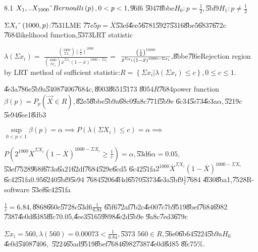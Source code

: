 \documentclass{article}
\begin{document}
8.1 $X_{1},..X_{1000}\symbol{126}Bernoulli\left( p\right) ,0<p<1,$\U{96f6}%
\U{5047}\U{8bbe}$H_{0}:p=\frac{1}{2},$\U{5bf9}$H_{1}:p\neq \frac{1}{2}$

$\Sigma X_{i}\symbol{126}\left( 1000,p\right) $:\U{7531}LME \U{77e5}$p=%
\overline{X}$\U{53ef}\U{4ee5}\U{6781}\U{5927}\U{5316}\U{8be5}\U{6837}\U{672c}%
\U{7684}likelihood function,\U{5373}LRT statistic

$\lambda \left( \Sigma x_{i}\right) =$ $\frac{\binom{1000}{\Sigma x_{i}}%
\left( \frac{1}{2}\right) ^{1000}}{\binom{1000}{\Sigma x_{i}}\bar{x}^{\Sigma
x_{i}}\left( 1-\bar{x}\right) ^{1000-\Sigma x_{i}}}=$ $\frac{\left( \frac{1}{%
2}\right) ^{1000}}{\bar{x}^{\Sigma x_{i}}\left( 1-\bar{x}\right)
^{1000-\Sigma x_{i}}},$\U{8bbe}\U{7f6e}Rejection region by LRT method of
sufficient statistic:$R=\left\{ \Sigma x_{i}|\lambda \left( \Sigma
x_{i}\right) \leq c\right\} ,0\leq c\leq 1.$

\U{4e3a}\U{786e}\U{5b9a}\U{5408}\U{7406}\U{7684}$c,$\U{8003}\U{8651}\U{5173}%
\U{8054}$R$\U{7684}power function $\beta \left( p\right) =P_{p}\left( \vec{X}%
\in R\right) ,$\U{82e5}\U{8bbe}\U{5b9a}\U{68c0}\U{9a8c}\U{771f}\U{5b9e}%
\U{6c34}\U{5e73}\U{4e3a}$\alpha ,$\U{5219}$c$\U{5e94}\U{6ee1}\U{8db3}

$\underset{0<p<1}{\sup }\beta \left( p\right) =\alpha \implies P\left(
\lambda \left( \Sigma X_{i}\right) \leq c\right) =\alpha \implies $

$P\left( 2^{1000}\overline{X}^{\Sigma X_{i}}\left( 1-\overline{X}\right)
^{1000-\Sigma X_{i}}\geq \frac{1}{c}\right) =\alpha ,$\U{53d6}$\alpha =0.05,$%
\U{53ef}\U{7528}\U{968f}\U{673a}\U{6a21}\U{62df}\U{7684}\U{529e}\U{6cd5}%
\U{6c42}\U{51fa}$2^{1000}\overline{X}^{\Sigma X_{i}}\left( 1-\overline{X}%
\right) ^{1000-\Sigma X_{i}}$\U{6c42}\U{51fa}0.95\U{6240}\U{5bf9}\U{5e94}%
\U{7684}\U{5206}\U{4f4d}\U{6570}\U{5373}\U{4e3a}\U{5bf9}$\frac{1}{c}$\U{7684}%
\U{4f30}\U{8ba1},\U{7528}R-software \U{53ef}\U{6c42}\U{51fa}

$\frac{1}{c}=6.84,$\U{8868}\U{660e}\U{5728}$c$\U{53d6}$\frac{1}{6.84}$%
\U{65f6}\U{72af}\U{7b2c}\U{4e00}\U{7c7b}\U{9519}\U{8bef}\U{7684}\U{6982}%
\U{7387}\U{4e0d}\U{8d85}\U{8fc7}0.05,\U{4ee3}\U{5165}\U{9898}\U{4e2d}\U{5b9e}%
\U{9a8c}\U{7ed3}\U{679c}

$\Sigma x_{i}=560,\lambda \left( 560\right) =0.00073<\frac{1}{6.84},$\U{5373}%
$560\in R,$\U{56e0}\U{6b64}\U{5224}\U{5b9a}$H_{0}$\U{4e0d}\U{5408}\U{7406}$,$%
\U{5224}\U{65ad}\U{9519}\U{8bef}\U{7684}\U{6982}\U{7387}\U{4e0d}\U{8d85}%
\U{8fc7}$5\%.$
\end{document}
